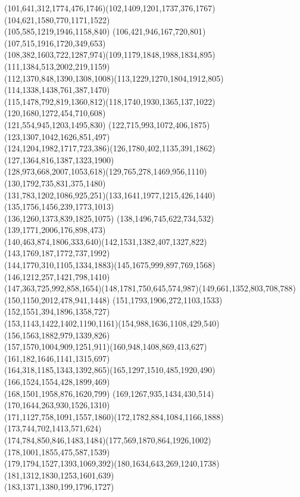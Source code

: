 \documentclass[a4paper,twopage,reqno,12pt]{amsart}
\theoremstyle{definition}
\numberwithin{equation}{section}
\begin{document}
\begin{enumerate}
{{(101,641,312,1774,476,1746)(102,1409,1201,1737,376,1767)(104,621,1580,770,1171,1522)\\(105,585,1219,1946,1158,840)
(106,421,946,167,720,801)(107,515,1916,1720,349,653)\\(108,382,1603,722,1287,974)(109,1179,1848,1988,1834,895)
(111,1384,513,2002,219,1159)\\(112,1370,848,1390,1308,1008)(113,1229,1270,1804,1912,805)(114,1338,1438,761,387,1470)\\
(115,1478,792,819,1360,812)(118,1740,1930,1365,137,1022)(120,1680,1272,454,710,608)\\(121,554,945,1203,1495,830)
(122,715,993,1072,406,1875)(123,1307,1042,1626,851,497)\\(124,1204,1982,1717,723,386)(126,1780,402,1135,391,1862)
(127,1364,816,1387,1323,1900)\\(128,973,668,2007,1053,618)(129,765,278,1469,956,1110)(130,1792,735,831,375,1480)\\
(131,783,1202,1086,925,251)(133,1641,1977,1215,426,1440)(135,1756,1456,239,1773,1013)\\(136,1260,1373,839,1825,1075)
(138,1496,745,622,734,532)(139,1771,2006,176,898,473)\\(140,463,874,1806,333,640)(142,1531,1382,407,1327,822)
(143,1769,187,1772,737,1992)\\(144,1770,310,1105,1334,1883)(145,1675,999,897,769,1568)(146,1212,257,1421,798,1410)\\
(147,363,725,992,858,1654)(148,1781,750,645,574,987)(149,661,1352,803,708,788)\\
(150,1150,2012,478,941,1448)
(151,1793,1906,272,1103,1533)(152,1551,394,1896,1358,727)\\
(153,1143,1422,1402,1190,1161)(154,988,1636,1108,429,540)
(156,1563,1882,979,1339,826)\\(157,1570,1004,909,1251,911)(160,948,1408,869,413,627)(161,182,1646,1141,1315,697)\\
(164,318,1185,1343,1392,865)(165,1297,1510,485,1920,490)(166,1524,1554,428,1899,469)\\(168,1501,1958,876,1620,799)
(169,1267,935,1434,430,514)(170,1644,263,930,1526,1310)\\(171,1127,758,1091,1557,1860)(172,1782,884,1084,1166,1888)
(173,744,702,1413,571,624)\\(174,784,850,846,1483,1484)(177,569,1870,864,1926,1002)
(178,1001,1855,475,587,1539)\\
(179,1794,1527,1393,1069,392)(180,1634,643,269,1240,1738)(181,1312,1830,1253,1601,639)\\(183,1371,1380,199,1796,1727)
}}
\end{enumerate}
\end{document}
